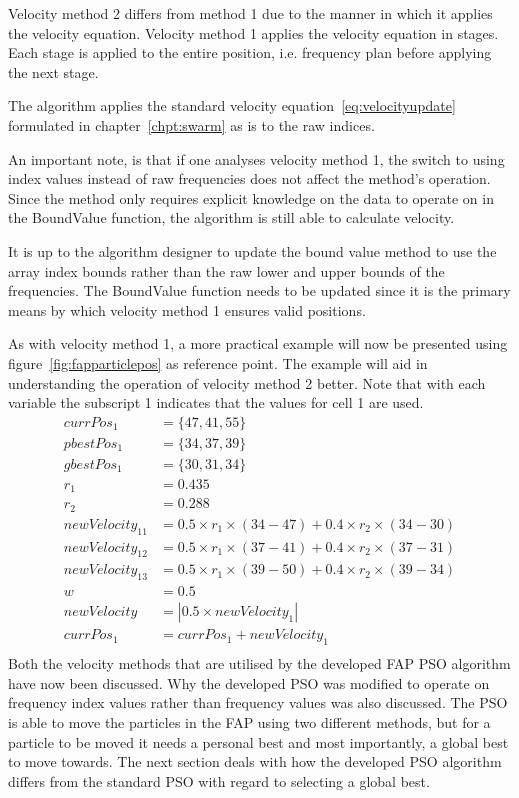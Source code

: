 Velocity method 2 differs from method 1 due to the manner in which it applies the velocity equation. Velocity method 1 applies the velocity equation in stages. Each stage is applied to the entire position, i.e. frequency plan before applying the next stage. 

The algorithm applies the standard velocity equation~\ref{eq:velocityupdate} formulated in chapter~\ref{chpt:swarm} as is to the raw indices.

An important note, is that if one analyses velocity method 1, the switch to using index values instead of raw frequencies does not affect the method's operation. Since the method only requires explicit knowledge on the data to operate on in the BoundValue function, the algorithm is still able to calculate velocity. 

It is up to the algorithm designer to update the bound value method to use the array index bounds rather than the raw lower and upper bounds of the frequencies. The BoundValue function needs to be updated since it is the primary means by which velocity method 1 ensures valid positions.

As with velocity method 1, a more practical example will now be presented using figure~\ref{fig:fapparticlepos} as reference point. The example will aid in understanding the operation of velocity method 2 better. Note that with each variable the subscript 1 indicates that the values for cell 1 are used.
\begin{align}
    currPos_1 &= \{47,41,55\}\nonumber \\
    pbestPos_1 &= \{34,37,39\}\nonumber \\
    gbestPos_1 &= \{30, 31,34\}\nonumber \\
    r_1 &= 0.435\nonumber \\
    r_2 &= 0.288\nonumber \\
    newVelocity_{11} &= 0.5 \times r_1 \times (34 - 47) + 0.4 \times r_2 \times (34 - 30)\nonumber \\
    newVelocity_{12} &= 0.5 \times r_1 \times (37 - 41) + 0.4 \times r_2 \times (37 - 31)\nonumber \\
    newVelocity_{13} &= 0.5 \times r_1 \times (39 - 50) + 0.4 \times r_2 \times (39 - 34)\nonumber \\
    w &= 0.5\nonumber \\
    newVelocity &= |0.5 \times newVelocity_1|\nonumber \\
    currPos_1 &= currPos_1 + newVelocity_1\nonumber \\
\end{align}
Both the velocity methods that are utilised by the developed \gls{FAP} \gls{PSO} algorithm have now been discussed. Why the developed \gls{PSO} was modified to operate on frequency index values rather than frequency values was also discussed. The \gls{PSO} is able to move the particles in the \gls{FAP} using two different methods, but for a particle to be moved it needs a personal best and most importantly, a global best to move towards. The next section deals with how the developed \gls{PSO} algorithm differs from the standard \gls{PSO} with regard to selecting a global best.
